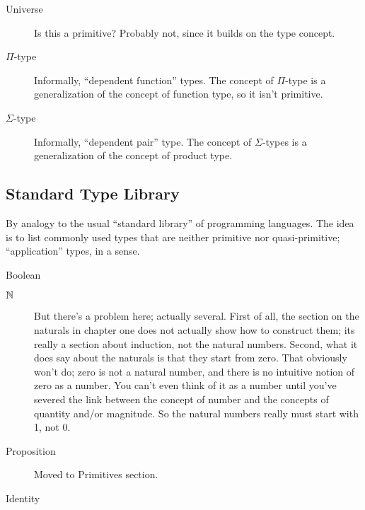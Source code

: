 \begin{description}

\item [Universe]  Is this a primitive?  Probably not, since it builds on the type concept.

\item [\(\Pi\)-type] Informally, ``dependent function''
  types.  The concept of \(\Pi\)-type is a generalization of the
  concept of function type, so it isn't primitive.

\item [\(\Sigma\)-type] Informally, ``dependent pair''
  type.
  The concept of \(\Sigma\)-types is a generalization of the concept
  of product type.

\end{description}

\subsection{\HoTT Standard Type Library}
\label{subs:hottstdlib}

\begin{remark}
  By analogy to the usual ``standard library'' of programming
  languages.  The idea is to list commonly used types that are neither
  primitive nor quasi-primitive; ``application'' types, in a sense.
\end{remark}


\begin{description}
\item [Boolean] \citep[p. 34]{hottbook}
\item [$\mathbb{N}$] \citep[p. 36]{hottbook} But there's a problem here;
  actually several.  First of all, the section on the naturals in
  chapter one does not actually show how to construct them; its really
  a section about induction, not the natural numbers.  Second, what it
  does say about the naturals is that they start from zero.  That
  obviously won't do; zero is not a natural number, and there is no
  intuitive notion of zero as a number.  You can't even think of it as
  a number until you've severed the link between the concept of number
  and the concepts of quantity and/or magnitude.  So the natural
  numbers really must start with 1, not 0.
\item [Proposition]  Moved to Primitives section.
\item [Identity]
\end{description}

